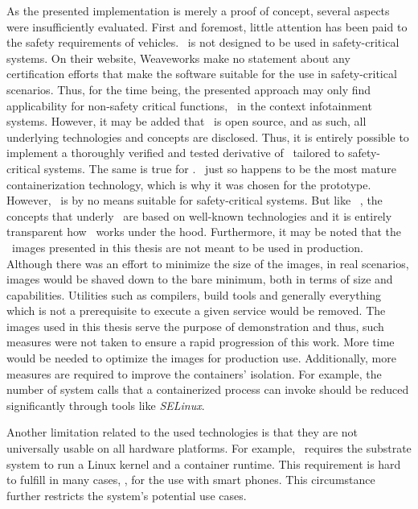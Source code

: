 As the presented implementation is merely a proof of concept, several aspects were insufficiently evaluated. First and foremost, little attention has been paid to the safety requirements of vehicles. \wnet\ is not designed to be used in safety-critical systems. On their website, Weaveworks make no statement about any certification efforts that make the software suitable for the use in safety-critical scenarios. Thus, for the time being, the presented approach may only find applicability for non-safety critical functions, \eg\ in the context infotainment systems. However, it may be added that \wnet\ is open source, and as such, all underlying technologies and concepts are disclosed. Thus, it is entirely possible to implement a thoroughly verified and tested derivative of \wnet\ tailored to safety-critical systems.
The same is true for \docker . \docker\ just so happens to be the most mature containerization technology, which is why it was chosen for the prototype. However, \docker\ is by no means suitable for safety-critical systems. But like \wnet\ , the concepts that underly \docker\ are based on well-known technologies and it is entirely transparent how \docker\ works under the hood. Furthermore, it may be noted that the \docker\ images presented in this thesis are not meant to be used in production. Although there was an effort to minimize the size of the images, in real scenarios, images would be shaved down to the bare minimum, both in terms of size and capabilities. Utilities such as compilers, build tools and generally everything which is not a prerequisite to execute a given service would be removed. The images used in this thesis serve the purpose of demonstration and thus, such measures were not taken to ensure a rapid progression of this work. More time would be needed to optimize the images for production use. Additionally, more measures are required to improve the containers' isolation. For example, the number of system calls that a containerized process can invoke should be reduced significantly through tools like \emph{SELinux}.

Another limitation related to the used technologies is that they are not universally usable on all hardware platforms. For example, \docker\ requires the substrate system to run a Linux kernel and a container runtime. This requirement is hard to fulfill in many cases, \eg , for the use with smart phones. This circumstance further restricts the system's potential use cases.

